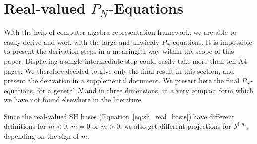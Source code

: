 \section{Real-valued $P_N$-Equations}
\label{sec:real_valued_pn_eq}

With the help of  computer algebra representation framework, we are able to easily derive and work with the large and unwieldy $P_N$-equations. It is impossible to present the derivation steps in a meaningful way within the scope of this paper. Displaying a single intermediate step could easily take more than ten A4 pages. We therefore decided to give only the final result in this section, and present the derivation in a supplemental document. We present here the final $P_N$-equations, for a general $N$ and in three dimensions, in a very compact form which we have not found elsewhere in the literature

Since the real-valued SH bases (Equation~\ref{eq:sh_real_basis}) have different definitions for $m<0$, $m=0$ or $m>0$,  we also get different projections for $\mathcal{S}^{l,m}$, depending on the sign of $m$.


